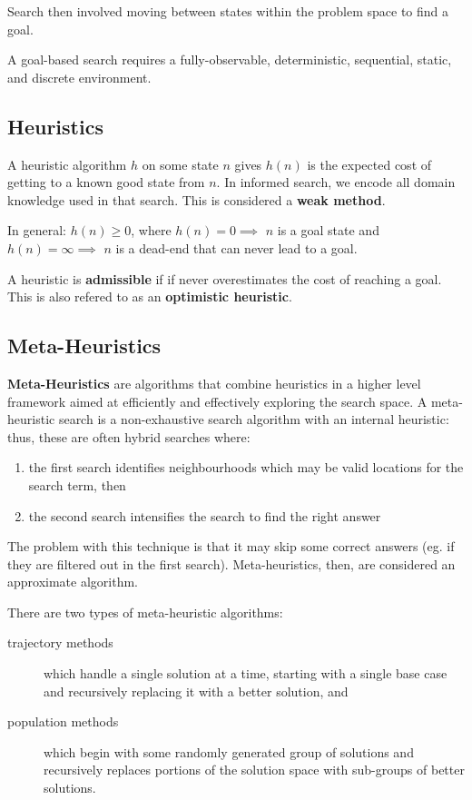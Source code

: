 \documentclass[12pt]{article}
\begin{document}
Search then involved moving between states within the problem space to find a goal.

A goal-based search requires a fully-observable, deterministic, sequential, static, and discrete environment.

\subsection{Heuristics}
A heuristic algorithm $h$ on some state $n$ gives $h(n)$ is the expected cost of getting to a known good state from $n$. In informed search, we encode all domain knowledge used in that search. This is considered a {\bf weak method}.

In general: $h(n) \geq 0$, where $h(n) = 0 \implies$ $n$ is a goal state and $h(n) = \infty \implies$ $n$ is a dead-end that can never lead to a goal.

A heuristic is {\bf admissible} if if never overestimates the cost of reaching a goal. This is also refered to as an {\bf optimistic heuristic}.

\subsection{Meta-Heuristics}
{\bf Meta-Heuristics} are algorithms that combine heuristics in a higher level framework aimed at efficiently and effectively exploring the search space. A meta-heuristic search is a non-exhaustive search algorithm with an internal heuristic: thus, these are often hybrid searches where:
\begin{enumerate}
\item the first search identifies neighbourhoods which may be valid locations for the search term, then
\item the second search intensifies the search to find the right answer
\end{enumerate}

The problem with this technique is that it may skip some correct answers (eg. if they are filtered out in the first search). Meta-heuristics, then, are considered an approximate algorithm.

There are two types of meta-heuristic algorithms:
\begin{description}
\item [trajectory methods] which handle a single solution at a time, starting with a single base case and recursively replacing it with a better solution, and
\item [population methods] which begin with some randomly generated group of solutions and recursively replaces portions of the solution space with sub-groups of better solutions.
\end{description}
\end{document}
